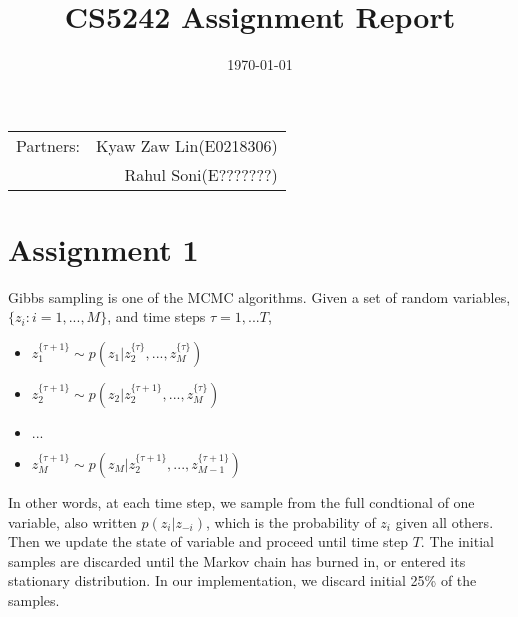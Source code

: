 \documentclass[paper=a4, fontsize=11pt]{scrartcl} %
\title{CS5242 Assignment Report} %
\date{\today} %
\begin{document}
\maketitle %

\begin{center}
\begin{tabular}{l r}
Partners: & Kyaw Zaw Lin(E0218306) \\ %
& Rahul Soni(E???????) \\

\end{tabular}
\end{center}



\section{Assignment 1}

Gibbs sampling is one of the MCMC algorithms. Given a set of random variables, $\{z_i:i=1,...,M\}$, and  time steps $\tau=1,...T$,
\begin{itemize}
	\item $z_1^{\{\tau+1\}} \sim  p(z_1|z_2^{\{\tau\}},...,z_M^{\{\tau\}})$
	\item $z_2^{\{\tau+1\}} \sim  p(z_2|z_2^{\{\tau+1\}},...,z_M^{\{\tau\}})$
	\item $...$
	\item $z_M^{\{\tau+1\}} \sim  p(z_M|z_2^{\{\tau+1\}},...,z_{M-1}^{\{\tau+1\}})$
\end{itemize}

In other words, at each time step, we sample from the full condtional of one variable, also written $p(z_i|z_{-i})$, which is the probability of $z_i$ given all others. Then we update the state of variable and proceed until time step $T$. The initial samples are discarded until the Markov chain has burned in, or entered its stationary distribution. In our implementation, we discard initial 25\% of the samples. 
\end{document}
